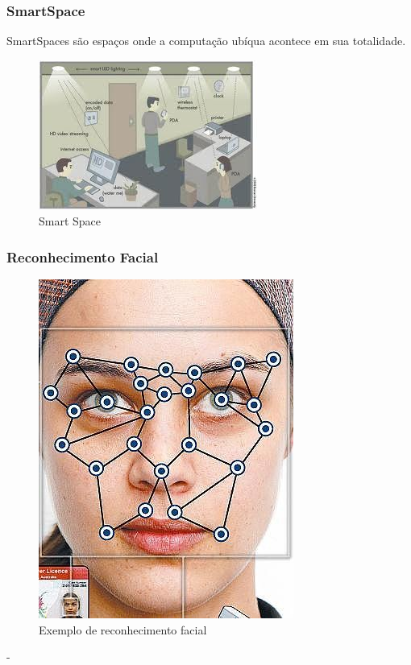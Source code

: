 \documentclass{beamer}
\begin{document}
\begin{frame}
    \frametitle{SmartSpace}

    SmartSpaces são espaços onde a computação ubíqua acontece em sua totalidade.
    
    \begin{figure}[h]
    	\centering \includegraphics[scale=0.65]{figuras/smartSpace.jpg}
    	\caption{Smart Space}
    	\label{smart_space} 
    \end{figure}
\end{frame}

\begin{frame}
    \frametitle{Reconhecimento Facial}
    
    \begin{figure}[h]
	\centering \includegraphics[scale=0.4]{figuras/face-recognition.jpg}
    	\caption{Exemplo de reconhecimento facial}
    	\label{reconhecimento_facial}
    \end{figure}-
\end{frame}
\end{document}
